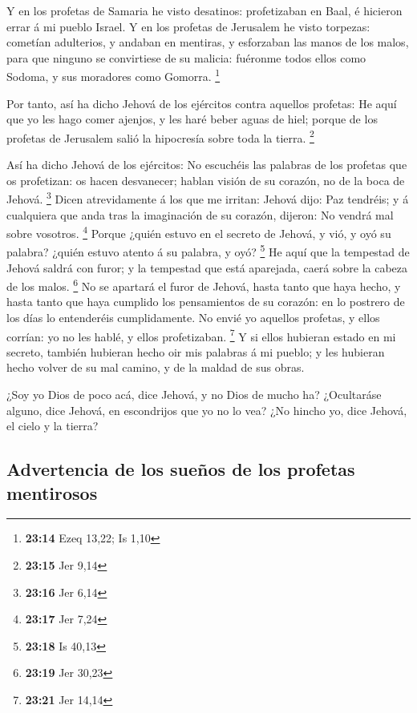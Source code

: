 Y en los profetas de Samaria he visto desatinos:
profetizaban en Baal, é hicieron errar á mi pueblo Israel.
 Y en los profetas de Jerusalem he visto torpezas:
cometían adulterios, y andaban en mentiras, y esforzaban las manos de
los malos, para que ninguno se convirtiese de su malicia: fuéronme todos
ellos como Sodoma, y sus moradores como Gomorra. \footnote{\textbf{23:14}
  Ezeq 13,22; Is 1,10}

 Por tanto, así ha dicho Jehová de los ejércitos contra
aquellos profetas: He aquí que yo les hago comer ajenjos, y les haré
beber aguas de hiel; porque de los profetas de Jerusalem salió la
hipocresía sobre toda la tierra. \footnote{\textbf{23:15} Jer 9,14}

 Así ha dicho Jehová de los ejércitos: No escuchéis las
palabras de los profetas que os profetizan: os hacen desvanecer; hablan
visión de su corazón, no de la boca de Jehová. \footnote{\textbf{23:16}
  Jer 6,14}  Dicen atrevidamente á los que me irritan:
Jehová dijo: Paz tendréis; y á cualquiera que anda tras la imaginación
de su corazón, dijeron: No vendrá mal sobre vosotros. \footnote{\textbf{23:17}
  Jer 7,24}  Porque ¿quién estuvo en el secreto de
Jehová, y vió, y oyó su palabra? ¿quién estuvo atento á su palabra, y
oyó? \footnote{\textbf{23:18} Is 40,13}  He aquí que la
tempestad de Jehová saldrá con furor; y la tempestad que está aparejada,
caerá sobre la cabeza de los malos. \footnote{\textbf{23:19} Jer 30,23}
 No se apartará el furor de Jehová, hasta tanto que haya
hecho, y hasta tanto que haya cumplido los pensamientos de su corazón:
en lo postrero de los días lo entenderéis cumplidamente. 
No envié yo aquellos profetas, y ellos corrían: yo no les hablé, y ellos
profetizaban. \footnote{\textbf{23:21} Jer 14,14}  Y si
ellos hubieran estado en mi secreto, también hubieran hecho oir mis
palabras á mi pueblo; y les hubieran hecho volver de su mal camino, y de
la maldad de sus obras.

 ¿Soy yo Dios de poco acá, dice Jehová, y no Dios de
mucho ha?  ¿Ocultaráse alguno, dice Jehová, en
escondrijos que yo no lo vea? ¿No hincho yo, dice Jehová, el cielo y la
tierra?

\hypertarget{advertencia-de-los-sueuxf1os-de-los-profetas-mentirosos}{%
\subsection{Advertencia de los sueños de los profetas
mentirosos}\label{advertencia-de-los-sueuxf1os-de-los-profetas-mentirosos}}

